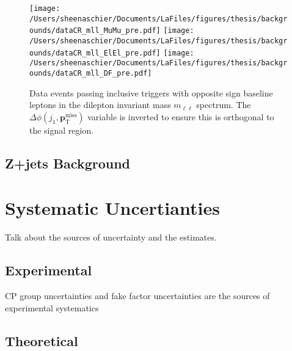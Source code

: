 \documentclass[11pt, oneside]{article}   	%
\begin{document}
 \begin{figure}
 \centering
    \texttt{[image: /Users/sheenaschier/Documents/LaFiles/figures/thesis/backgrounds/dataCR\_mll\_MuMu\_pre.pdf]}
 \texttt{[image: /Users/sheenaschier/Documents/LaFiles/figures/thesis/backgrounds/dataCR\_mll\_ElEl\_pre.pdf]}
  \texttt{[image: /Users/sheenaschier/Documents/LaFiles/figures/thesis/backgrounds/dataCR\_mll\_DF\_pre.pdf]}
  \caption{Data events passing inclusive \met{} triggers with opposite sign baseline leptons in the dilepton invariant mass $m_{\ell\ell}$ spectrum. The $\Delta\phi(j_1, \mathbf{p}_\mathrm{    T}^\mathrm{miss})$ variable is inverted to ensure this is orthogonal to the signal region.}
  \label{fig:mll_data}
 \end{figure}
\FloatBarrier

\subsection{Z+jets Background}
\label{sec:elements}


 
\clearpage
\section{Systematic Uncertianties}
\label{sec:syst}
Talk about the sources of uncertainty and the estimates.

\subsection{Experimental}
\label{sec:systexp}
CP group uncertainties and fake factor uncertainties are the sources of experimental systematics

\subsection{Theoretical}
\label{sec:systthy}
\end{document}
